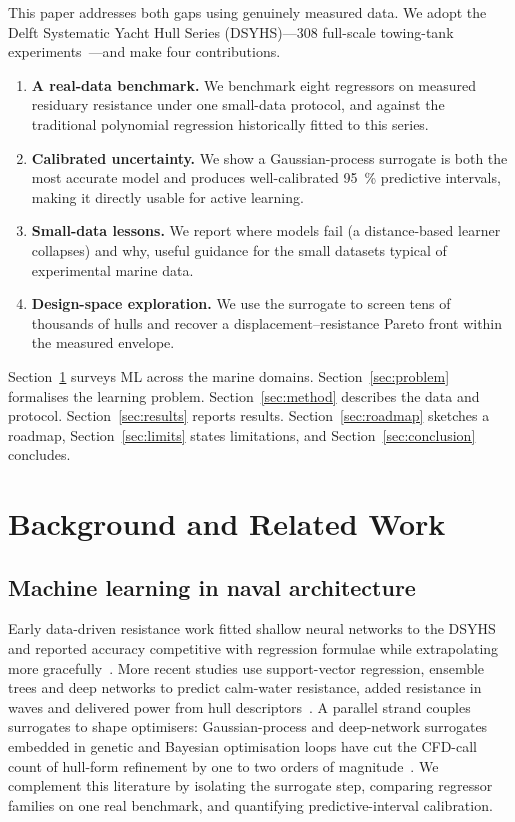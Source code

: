 \documentclass[conference]{IEEEtran}
\begin{document}
This paper addresses both gaps using genuinely measured data. We adopt the
Delft Systematic Yacht Hull Series (DSYHS)---\num{308} full-scale towing-tank
experiments~\cite{gerritsma1981,uci}---and make four contributions.
\begin{enumerate}
\item \textbf{A real-data benchmark.} We benchmark eight regressors on measured
residuary resistance under one small-data protocol, and against the traditional
polynomial regression historically fitted to this series.
\item \textbf{Calibrated uncertainty.} We show a Gaussian-process surrogate is
both the most accurate model and produces well-calibrated \SI{95}{\percent}
predictive intervals, making it directly usable for active learning.
\item \textbf{Small-data lessons.} We report where models fail (a distance-based
learner collapses) and why, useful guidance for the small datasets typical of
experimental marine data.
\item \textbf{Design-space exploration.} We use the surrogate to screen tens of
thousands of hulls and recover a displacement--resistance Pareto front within
the measured envelope.
\end{enumerate}

Section~\ref{sec:related} surveys ML across the marine domains.
Section~\ref{sec:problem} formalises the learning problem.
Section~\ref{sec:method} describes the data and protocol.
Section~\ref{sec:results} reports results. Section~\ref{sec:roadmap} sketches a
roadmap, Section~\ref{sec:limits} states limitations, and
Section~\ref{sec:conclusion} concludes.

\section{Background and Related Work}
\label{sec:related}

\subsection{Machine learning in naval architecture}
Early data-driven resistance work fitted shallow neural networks to the DSYHS
and reported accuracy competitive with regression formulae while extrapolating
more gracefully~\cite{ortigosa2009}. More recent studies use support-vector
regression, ensemble trees and deep networks to predict calm-water resistance,
added resistance in waves and delivered power from hull
descriptors~\cite{cepowski2020,ao2021,kim2020}. A parallel strand couples
surrogates to shape optimisers: Gaussian-process and deep-network surrogates
embedded in genetic and Bayesian optimisation loops have cut the CFD-call count
of hull-form refinement by one to two orders of
magnitude~\cite{marlantes2023,liu2022,serani2016}. We complement this literature
by isolating the surrogate step, comparing regressor families on one real
benchmark, and quantifying predictive-interval calibration.
\end{document}
